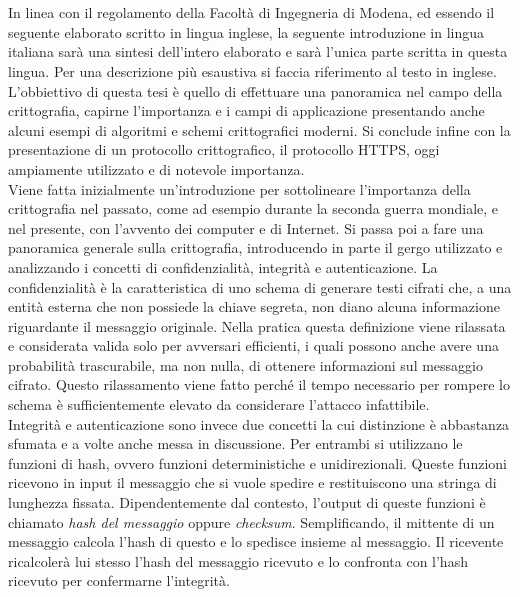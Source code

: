 \chapter*{}
In linea con il regolamento della Facoltà di Ingegneria di Modena, ed essendo il seguente elaborato scritto in lingua inglese, la seguente introduzione in lingua italiana sarà una sintesi dell'intero elaborato e sarà l'unica parte scritta in questa lingua. Per una descrizione più esaustiva si faccia riferimento al testo in inglese.\\
L'obbiettivo di questa tesi è quello di effettuare una panoramica nel campo della crittografia, capirne l'importanza e i campi di applicazione presentando anche alcuni esempi di algoritmi e schemi crittografici moderni. Si conclude infine con la presentazione di un protocollo crittografico, il protocollo HTTPS, oggi ampiamente utilizzato e di notevole importanza.
\\
Viene fatta inizialmente un'introduzione per sottolineare l'importanza della crittografia nel passato, come ad esempio durante la seconda guerra mondiale, e nel presente, con l'avvento dei computer e di Internet. Si passa poi a fare una panoramica generale sulla crittografia, introducendo in parte il gergo utilizzato e analizzando i concetti di confidenzialità, integrità e autenticazione. La confidenzialità è la caratteristica di uno schema di generare testi cifrati che, a una entità esterna che non possiede la chiave segreta, non diano alcuna informazione riguardante il messaggio originale. Nella pratica questa definizione viene rilassata e considerata valida solo per avversari efficienti, i quali possono anche avere una probabilità trascurabile, ma non nulla, di ottenere informazioni sul messaggio cifrato. Questo rilassamento viene fatto perché il tempo necessario per rompere lo schema è sufficientemente elevato da considerare l'attacco infattibile.\\
 Integrità e autenticazione sono invece due concetti la cui distinzione è abbastanza sfumata e a volte anche messa in discussione. Per entrambi si utilizzano le funzioni di hash, ovvero funzioni deterministiche e unidirezionali. Queste funzioni ricevono in input il messaggio che si vuole spedire e restituiscono una stringa di lunghezza fissata. Dipendentemente dal contesto, l'output di queste funzioni è chiamato \emph{hash del messaggio} oppure \emph{checksum}. Semplificando, il mittente di un messaggio calcola l'hash di questo e lo spedisce insieme al messaggio. Il ricevente ricalcolerà lui stesso l'hash del messaggio ricevuto e lo confronta con l'hash ricevuto per confermarne l'integrità.
